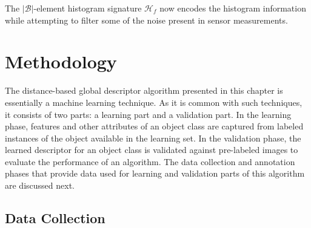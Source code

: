 The $|\mathcal{B}|$-element histogram signature $\mathcal{H}_f$ now encodes the histogram information while attempting to filter some of the noise present in sensor measurements.

\section{Methodology}
\label{sec:distdes_methodology}


The distance-based global descriptor algorithm presented in this chapter is essentially a machine learning technique. As it is common with such techniques, it consists of two parts: a learning part and a validation part. In the learning phase, features and other attributes of an object class are captured from labeled instances of the object available in the learning set. In the validation phase, the learned descriptor for an object class is validated against pre-labeled images to evaluate the performance of an algorithm. The data collection and annotation phases that provide data used for learning and validation parts of this algorithm are discussed next.

\subsection{Data Collection}
\label{sec:distdes_data_collection}


